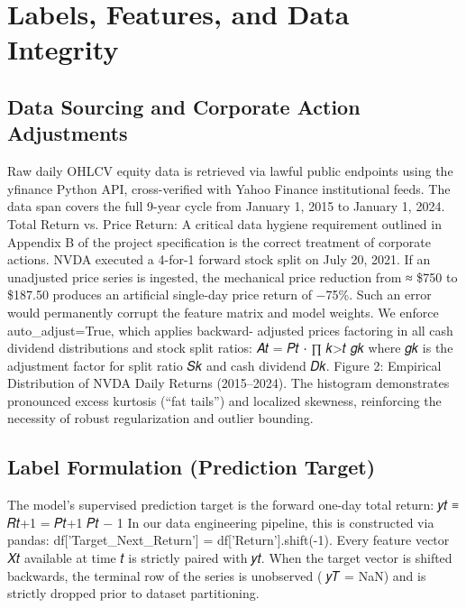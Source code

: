 \documentclass[12pt, a4paper]{article}
\begin{document}
\section{Labels, Features, and Data Integrity}
\subsection{Data Sourcing and Corporate Action Adjustments}
Raw daily OHLCV equity data is retrieved via lawful public endpoints using the yfinance Python API, 
cross-verified with Yahoo Finance institutional feeds. The data span covers the full 9-year cycle from 
January 1, 2015 to January 1, 2024.
Total Return vs. Price Return: A critical data hygiene requirement outlined in Appendix B of the project 
specification is the correct treatment of corporate actions. NVDA executed a 4-for-1 forward stock split 
on July 20, 2021. If an unadjusted price series is ingested, the mechanical price reduction from ≈ \$750 
to \$187.50 produces an artificial single-day price return of −75\%. Such an error would permanently 
corrupt the feature matrix and model weights. We enforce auto\_adjust=True, which applies backward-
adjusted prices factoring in all cash dividend distributions and stock split ratios:
𝐴𝑡 = 𝑃𝑡 ⋅ ∏
𝑘>𝑡
𝑔𝑘
where 𝑔𝑘 is the adjustment factor for split ratio 𝑆𝑘 and cash dividend 𝐷𝑘.
Figure 2: Empirical Distribution of NVDA Daily Returns (2015–2024). The histogram demonstrates 
pronounced excess kurtosis (``fat tails'') and localized skewness, reinforcing the necessity of robust 
regularization and outlier bounding.

\subsection{Label Formulation (Prediction Target)}
The model's supervised prediction target is the forward one-day total return:
𝑦𝑡 ≡ 𝑅{𝑡+1} =
𝑃{𝑡+1}
𝑃𝑡
− 1
In our data engineering pipeline, this is constructed via pandas: df['Target\_Next\_Return'] = 
df['Return'].shift(-1). Every feature vector 𝑋𝑡 available at time 𝑡 is strictly paired with 𝑦𝑡. When 
the target vector is shifted backwards, the terminal row of the series is unobserved ( 𝑦𝑇 = NaN) and is 
strictly dropped prior to dataset partitioning.
\end{document}
